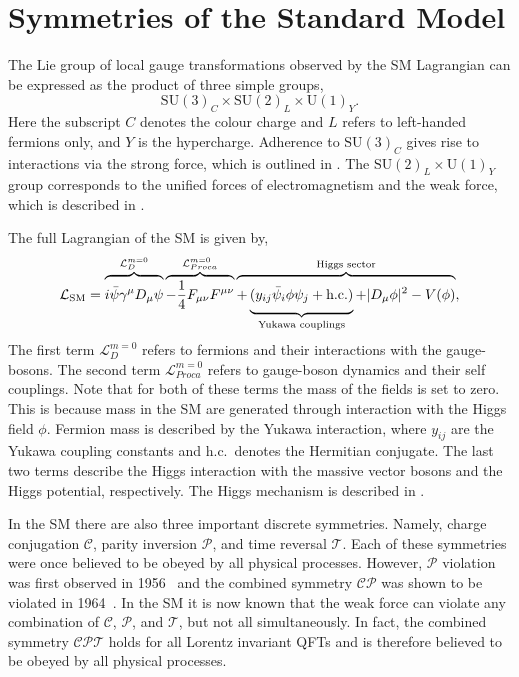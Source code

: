 \section{Symmetries of the Standard Model}
\label{sec:symmetries_of_sm}

The Lie group of local gauge transformations observed by the SM Lagrangian can be expressed as the product of three simple groups,
\begin{equation}
    \label{eq:sm_group}
    \text{SU}(3)_C \times \text{SU}(2)_L \times \text{U}(1)_Y.
\end{equation}
Here the subscript $C$ denotes the colour charge and $L$ refers to left-handed fermions only, and $Y$ is the hypercharge.
Adherence to $\text{SU}(3)_C$ gives rise to interactions via the strong force, which is outlined in .
The $\text{SU}(2)_L \times \text{U}(1)_Y$ group corresponds to the unified forces of electromagnetism and the weak force, which is described in .

The full Lagrangian of the SM is given by,
\begin{equation}
    \label{eq:sm_lagrangian}
    \mathcal{L}_\text{SM} =
    \overbrace{
        \vphantom{\frac{1}{4}}
        i \bar \psi \gamma^\mu D_\mu \psi
    }^{\mathcal{L}_{D}^{m=0}
    }
    \overbrace{
        -\frac{1}{4} F_{\mu\nu} F^{\mu\nu}
    }^{\mathcal{L}_{Proca}^{m=0}
    }
    \overbrace{
        +
        \underbrace{
            \vphantom{\frac{1}{4}}
            (y_{ij} \bar \psi_i \phi \psi_j
            + \text{h.c.})
        }_{\text{Yukawa couplings}}
        + |D_\mu \phi|^2
        - V(\phi)
    }^{\text{Higgs sector}},
\end{equation}
The first term $\mathcal{L}_D^{m=0}$ refers to fermions and their interactions with the gauge-bosons.
The second term $\mathcal{L}_{Proca}^{m=0}$ refers to gauge-boson dynamics and their self couplings.
Note that for both of these terms the mass of the fields is set to zero.
This is because mass in the SM are generated through interaction with the Higgs field $\phi$.
Fermion mass is described by the Yukawa interaction, where $y_{ij}$ are the Yukawa coupling constants and h.c.\ denotes the Hermitian conjugate.
The last two terms describe the Higgs interaction with the massive vector bosons and the Higgs potential, respectively.
The Higgs mechanism is described in .

In the SM there are also three important discrete symmetries.
Namely, charge conjugation $\mathcal{C}$, parity inversion $\mathcal{P}$, and time reversal $\mathcal{T}$.
Each of these symmetries were once believed to be obeyed by all physical processes.
However, $\mathcal{P}$ violation was first observed in 1956~\cite{Wu1957} and the combined symmetry $\mathcal{CP}$ was shown to be violated in 1964~\cite{CPViolation}.
In the SM it is now known that the weak force can violate any combination of $\mathcal{C}$, $\mathcal{P}$, and $\mathcal{T}$, but not all simultaneously.
In fact, the combined symmetry $\mathcal{CPT}$ holds for all Lorentz invariant QFTs and is therefore believed to be obeyed by all physical processes.

